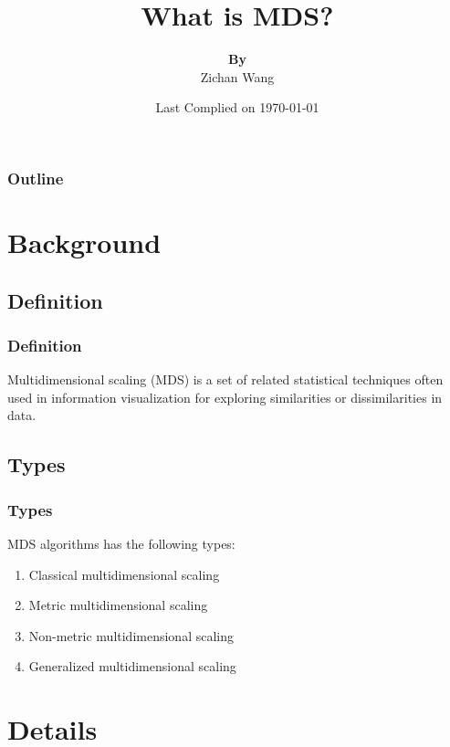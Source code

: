 \documentclass[compress,handout,10pt]{beamer}
\title{{\color{blue} \LARGE What is MDS? \newline} }
\author{ 
    {\bf{By}} \\ 
Zichan Wang \\ 
    \vspace{5pt}
}
\institute{JHU AMS 2012 FALL}
\date{\mygreen Last Complied on \today}
\let\olditem\item
\renewcommand{\item}{\setlength{\itemsep}{0.5\baselineskip}\olditem}
\begin{document}
\begin{frame}[plain]
    \titlepage
\end{frame}

\begin{frame}
    \frametitle{Outline}
    \tableofcontents
\end{frame}


\section{Background}

\subsection{Definition}
\begin{frame}
    \frametitle{Definition}
Multidimensional scaling (MDS) is a set of related statistical techniques often used in information visualization for exploring similarities or dissimilarities in data. 
\end{frame}




\subsection{Types}    


\begin{frame}
       \frametitle{Types}
MDS algorithms has the following types:
    \begin{enumerate}
        \item Classical multidimensional scaling
        \item Metric multidimensional scaling
        \item Non-metric multidimensional scaling
        \item Generalized multidimensional scaling
     \end{enumerate}
\end{frame}






\section{Details}
\end{document}
